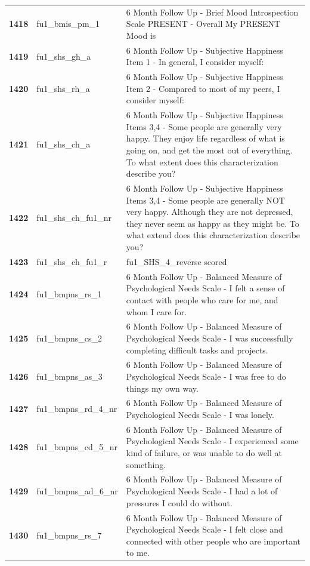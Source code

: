 \documentclass[
  letterpaper,
  DIV=11,
  numbers=noendperiod]{scrartcl}
\begin{document}
\begin{longtable}[t]{>{}cll}
\textbf{1418} & fu1\_bmis\_pm\_1 & 6 Month Follow Up - Brief Mood Introspection Scale PRESENT - Overall My PRESENT Mood is\\
\textbf{1419} & fu1\_shs\_gh\_a & 6 Month Follow Up - Subjective Happiness Item 1 - In general, I consider myself:\\
\textbf{1420} & fu1\_shs\_rh\_a & 6 Month Follow Up - Subjective Happiness Item 2 - Compared to most of my peers, I consider myself:\\
\addlinespace
\textbf{1421} & fu1\_shs\_ch\_a & 6 Month Follow Up - Subjective Happiness Items 3,4 - Some people are generally very happy. They enjoy life regardless of what is going on, and get the most out of everything. To what extent does this characterization describe you?\\
\textbf{1422} & fu1\_shs\_ch\_fu1\_nr & 6 Month Follow Up - Subjective Happiness Items 3,4 - Some people are generally NOT very happy. Although they are not depressed, they never seem as happy as they might be. To what extend does this characterization describe you?\\
\textbf{1423} & fu1\_shs\_ch\_fu1\_r & fu1\_SHS\_4\_reverse scored\\
\textbf{1424} & fu1\_bmpns\_rs\_1 & 6 Month Follow Up - Balanced Measure of Psychological Needs Scale - I felt a sense of contact with people who care for me, and whom I care for.\\
\textbf{1425} & fu1\_bmpns\_cs\_2 & 6 Month Follow Up - Balanced Measure of Psychological Needs Scale - I was successfully completing difficult tasks and projects.\\
\addlinespace
\textbf{1426} & fu1\_bmpns\_as\_3 & 6 Month Follow Up - Balanced Measure of Psychological Needs Scale - I was free to do things my own way.\\
\textbf{1427} & fu1\_bmpns\_rd\_4\_nr & 6 Month Follow Up - Balanced Measure of Psychological Needs Scale - I was lonely.\\
\textbf{1428} & fu1\_bmpns\_cd\_5\_nr & 6 Month Follow Up - Balanced Measure of Psychological Needs Scale - I experienced some kind of failure, or was unable to do well at something.\\
\textbf{1429} & fu1\_bmpns\_ad\_6\_nr & 6 Month Follow Up - Balanced Measure of Psychological Needs Scale - I had a lot of pressures I could do without.\\
\textbf{1430} & fu1\_bmpns\_rs\_7 & 6 Month Follow Up - Balanced Measure of Psychological Needs Scale - I felt close and connected with other people who are important to me.\\

\end{longtable}
\end{document}
